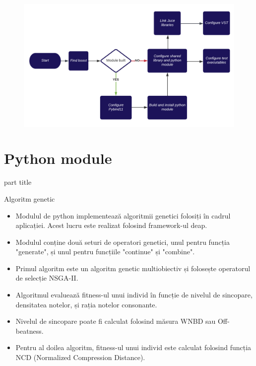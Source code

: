 \documentclass{beamer}
\begin{document}
\begin{frame}
\begin{center}
    \begin{figure}
        \centering
        \includegraphics[scale=0.7]{Architecture.png}
    \end{figure}
\end{center}
\end{frame}

\section{Python module}
\begin{frame}
    \begin{centering}
        \begin{beamercolorbox}[sep=12pt,center,rounded=true]{part title}
            \insertsection\par
        \end{beamercolorbox}
    \end{centering}
\end{frame}

\begin{frame}{Algoritm genetic}
\begin{itemize}
    \item Modulul de python implementează algoritmii genetici folosiți în cadrul aplicației. Acest lucru este realizat folosind framework-ul deap.
    \item Modulul conține două seturi de operatori genetici, unul pentru funcția "generate", și unul pentru funcțiile "continue" și "combine".
    \item Primul algoritm este un algoritm genetic multiobiectiv și folosește operatorul de selecție NSGA-II.
    \item Algoritmul evaluează fitness-ul unui individ în funcție de nivelul de sincopare, densitatea notelor, și rația notelor consonante.
    \item Nivelul de sincopare poate fi calculat folosind măsura WNBD sau Off-beatness.
    \item Pentru al doilea algoritm, fitness-ul unui individ este calculat folosind funcția NCD (Normalized Compression Distance).
\end{itemize}
\end{frame}
\end{document}
